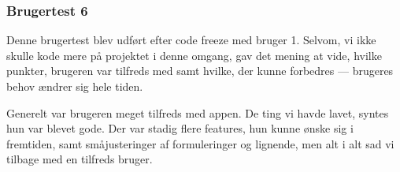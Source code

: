 \subsubsection{Brugertest 6}
Denne brugertest blev udført efter code freeze med bruger 1. Selvom, vi ikke skulle kode mere på projektet i denne omgang, gav det mening at vide, hvilke punkter, brugeren var tilfreds med samt hvilke, der kunne forbedres --- brugeres behov ændrer sig hele tiden.

Generelt var brugeren meget tilfreds med appen. De ting vi havde lavet, syntes hun var blevet gode. Der var stadig flere features, hun kunne ønske sig i fremtiden, samt småjusteringer af formuleringer og lignende, men alt i alt sad vi tilbage med en tilfreds bruger.

